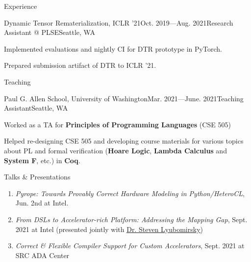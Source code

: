 \documentclass{resume}
\newcommand{\myul}[2][blue]{\setulcolor{#1}\ul{#2}\setulcolor{blue}}
\begin{document}
\begin{rSection}{Experience}
\begin{rSubsection}{Dynamic Tensor Rematerialization, ICLR '21}{Oct. 2019---Aug. 2021}{Research Assistant @ PLSE}{Seattle, WA}
            \item Implemented evaluations and nightly CI for DTR prototype in PyTorch.
            \item Prepared submission artifact of DTR to ICLR '21.
        \end{rSubsection}
    \end{rSection}
	\vspace{-5pt}
    \begin{rSection}{Teaching}
        \begin{rSubsection}{Paul G. Allen School, University of Washington}{Mar. 2021---June. 2021}{Teaching Assistant}{Seattle, WA}
			\item Worked as a TA for \textbf{Principles of Programming Languages} (CSE 505)
			\item Helped re-designing CSE 505 and developing course materials for various topics about PL and formal verification (\textbf{Hoare Logic}, \textbf{Lambda Calculus} and \textbf{System F}, etc.) in \textbf{Coq}.
		\end{rSubsection}
    \end{rSection}
    \vspace{-5pt}
	\begin{rSection}{Talks \& Presentations}
		\vspace{-5pt}
		\begin{enumerate}
			\setlength{\itemsep}{1pt}
			\setlength{\parskip}{0pt}
			\setlength{\parsep}{0pt}
            \item \textit{Pyrope: Towards Provably Correct Hardware Modeling in Python/HeteroCL}, Jun. 2nd at Intel.
			\item \textit{From DSLs to Accelerator-rich Platform: Addressing the Mapping Gap}, Sept. 2021 at Intel (presented jointly with \href{https://homes.cs.washington.edu/~sslyu/}{\color{blue} \myul {Dr. Steven Lyubomirsky}})
			\item \textit{Correct \& Flexible Compiler Support for Custom Accelerators}, Sept. 2021 at SRC ADA Center
		\end{enumerate} 
	\end{rSection}
\end{document}
